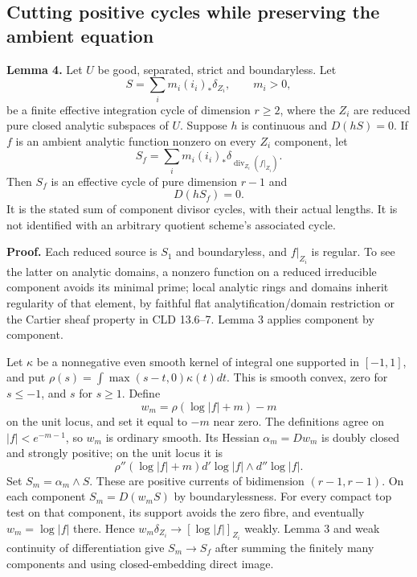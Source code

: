 \documentclass[
  10pt,
]{article}
\begin{document}
\subsection{Cutting positive cycles while preserving the ambient
equation}\label{cutting-positive-cycles-while-preserving-the-ambient-equation}

\textbf{Lemma 4.} Let \(U\) be good, separated, strict and boundaryless.
Let \[
 S=\sum_i m_i(i_i)_*\delta_{Z_i},\qquad m_i>0,
\] be a finite effective integration cycle of dimension \(r\geq2\),
where the \(Z_i\) are reduced pure closed analytic subspaces of \(U\).
Suppose \(h\) is continuous and \(D(hS)=0\). If \(f\) is an ambient
analytic function nonzero on every \(Z_i\) component, let \[
 S_f=\sum_i m_i(i_i)_*\delta_{\operatorname{div}_{Z_i}(f|_{Z_i})}.
\] Then \(S_f\) is an effective cycle of pure dimension \(r-1\) and \[
 D(hS_f)=0.                                               \tag{6}
\] It is the stated sum of component divisor cycles, with their actual
lengths. It is not identified with an arbitrary quotient scheme's
associated cycle.

\textbf{Proof.} Each reduced source is \(S_1\) and boundaryless, and
\(f|_{Z_i}\) is regular. To see the latter on analytic domains, a
nonzero function on a reduced irreducible component avoids its minimal
prime; local analytic rings and domains inherit regularity of that
element, by faithful flat analytification/domain restriction or the
Cartier sheaf property in CLD 13.6--7. Lemma 3 applies component by
component.

Let \(\kappa\) be a nonnegative even smooth kernel of integral one
supported in \([-1,1]\), and put \(\rho(s)=\int\max(s-t,0)\kappa(t)dt\).
This is smooth convex, zero for \(s\leq-1\), and \(s\) for \(s\geq1\).
Define \[
 w_m=\rho(\log|f|+m)-m
\] on the unit locus, and set it equal to \(-m\) near zero. The
definitions agree on \(|f|<e^{-m-1}\), so \(w_m\) is ordinary smooth.
Its Hessian \(\alpha_m=Dw_m\) is doubly closed and strongly positive; on
the unit locus it is \[
 \rho''(\log|f|+m)d'\log|f|\wedge d''\log|f|.
\] Set \(S_m=\alpha_m\wedge S\). These are positive currents of
bidimension \((r-1,r-1)\). On each component \(S_m=D(w_mS)\) by
boundarylessness. For every compact top test on that component, its
support avoids the zero fibre, and eventually \(w_m=\log|f|\) there.
Hence \(w_m\delta_{Z_i}\to[\log|f|]_{Z_i}\) weakly. Lemma 3 and weak
continuity of differentiation give \(S_m\to S_f\) after summing the
finitely many components and using closed-embedding direct image.
\end{document}
